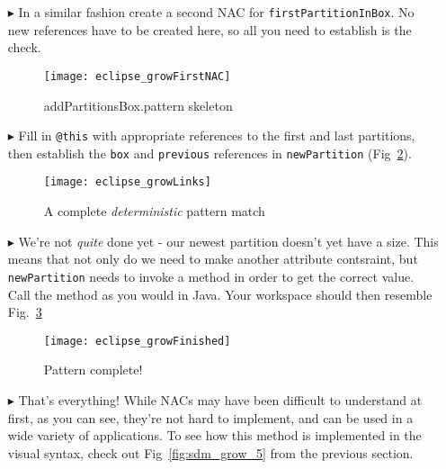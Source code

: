 \begin{itemize}
\vspace{0.5cm}

\item[$\blacktriangleright$] In a similar fashion create a second NAC for \texttt{firstPartitionInBox}. No new references have to be created here, so all you
need to establish is the check.

\begin{figure}[htp]
\begin{center}
  \texttt{[image: eclipse\_growFirstNAC]}
  \caption{addPartitionsBox.pattern skeleton}
  \label{fig:growPattSkel}
\end{center}
\end{figure}

\clearpage

\item[$\blacktriangleright$] Fill in \texttt{@this} with appropriate references to the first and last partitions, then establish the \texttt{box} and
\texttt{previous} references in \texttt{newPartition} (Fig~\ref{fig:growAllLinks}).

\vspace{0.5cm}

\begin{figure}[htp]
\begin{center}
  \texttt{[image: eclipse\_growLinks]}
  \caption{A complete \emph{deterministic} pattern match}
  \label{fig:growAllLinks}
\end{center}
\end{figure}

\item[$\blacktriangleright$] We're not \emph{quite} done yet - our newest partition doesn't yet have a size. This means that not only do we need to make
another attribute contsraint, but \texttt{newPartition} needs to invoke a method in order to get the correct value. Call the method as you would in Java. 
Your workspace should then resemble Fig.~\ref{fig:patternComplete}

\begin{figure}[htp]
\begin{center}
  \texttt{[image: eclipse\_growFinished]}
  \caption{Pattern complete!}
  \label{fig:patternComplete}
\end{center}
\end{figure}

\vspace{0.5cm}

\item[$\blacktriangleright$] That's everything! While NACs may have been difficult to understand at first, as you can see, they're not hard to implement, and
can be used in a wide variety of applications. To see how this method is implemented in the visual syntax, check out Fig~\ref{fig:sdm_grow_5} from the previous
section.

\end{itemize}